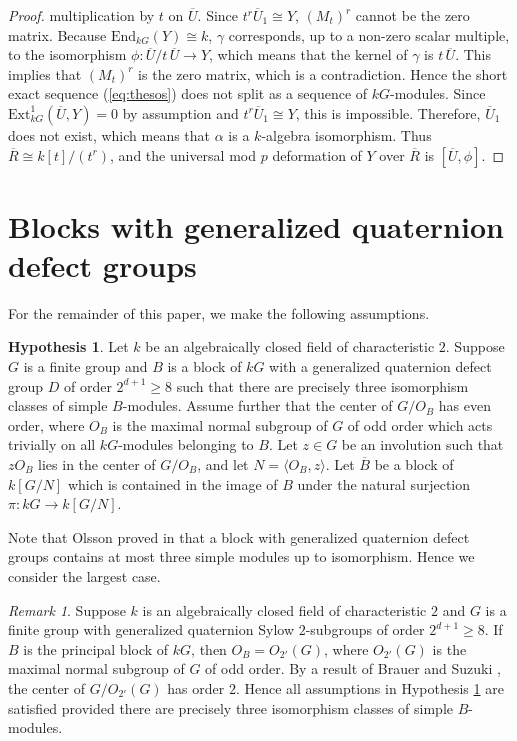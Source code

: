 \documentclass{amsart}
\theoremstyle{plain}
\theoremstyle{definition}
\newtheorem{hypo}[thm]{Hypothesis}
\theoremstyle{remark}
\newtheorem{rem}[thm]{Remark}
\begin{document}
\begin{proof}
multiplication by $t$ on $\overline{U}$. Since $t^{r}\overline{U}_1\cong Y$, 
$(M_t)^r$ cannot be the zero matrix.
Because $\mathrm{End}_{kG}(Y)\cong k$, $\gamma$ corresponds, up to a non-zero
scalar multiple,  to the isomorphism $\phi:\overline{U}/t\,\overline{U}\to Y$, which means that the kernel of 
$\gamma$ is $t\,\overline{U}$. 
This implies that $(M_t)^r$ is the zero matrix, 
which is a contradiction.
Hence the short exact sequence (\ref{eq:thesos}) does not split as a sequence of $kG$-modules. 
Since $\mathrm{Ext}^1_{kG}(\overline{U},Y)=0$ by assumption and $t^{r}\overline{U}_1\cong Y$, this 
is impossible. Therefore, $\overline{U}_1$ does not exist, which means that $\alpha$ is a 
$k$-algebra isomorphism. Thus $\overline{R}\cong k[t]/(t^{r})$, and the universal mod $p$ 
deformation of $Y$ over $\overline{R}$ is 
$[\overline{U},\phi]$.
\end{proof}

\section{Blocks with generalized quaternion defect groups}
\label{s:quaternionsylow}
\setcounter{equation}{0}
\setcounter{figure}{0}

For the remainder of this paper, we make the following assumptions.

\begin{hypo}
\label{hyp:alltheway}
Let $k$ be an algebraically closed field of characteristic $2$. Suppose $G$ is a finite group 
and $B$ is a block of $kG$ with a generalized quaternion defect group $D$ of order $2^{d+1}\ge 8$
such that there are precisely three isomorphism classes of simple $B$-modules.
Assume further that the center of $G/O_B$ has even order, where $O_B$ is the maximal
normal subgroup of $G$ of odd order which acts trivially on all $kG$-modules belonging to $B$.
Let $z\in G$ be an involution such that $zO_B$ lies in the center of $G/O_B$, and let
$N=\langle O_B,z\rangle$. Let $\overline{B}$ be a 
block of $k[G/N]$ which is contained in the image of $B$ under the natural surjection $\pi:kG\to k[G/N]$. 
\end{hypo}

Note that Olsson proved in \cite{olsson} that a block with generalized quaternion defect groups contains at 
most three simple modules up to isomorphism. Hence we consider the largest case.

\begin{rem}
\label{rem:principal}
Suppose $k$ is an algebraically closed field of characteristic $2$ and $G$ is a finite group with generalized 
quaternion Sylow $2$-subgroups of order $2^{d+1}\ge 8$. If $B$ is the principal block of $kG$, then
$O_B=O_{2'}(G)$, where $O_{2'}(G)$ is the maximal normal subgroup of $G$ of odd order.
By a result of Brauer and Suzuki \cite{brsu,br1}, the center of $G/O_{2'}(G)$ has order $2$. 
Hence all assumptions in Hypothesis
\ref{hyp:alltheway} are satisfied provided there are precisely three isomorphism classes of 
simple $B$-modules.
\end{rem}
\end{document}
